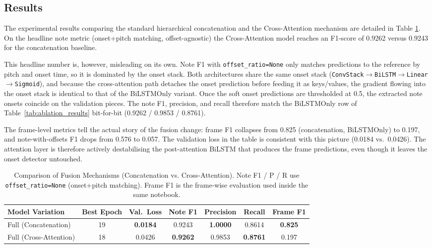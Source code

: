 \documentclass{article}
\begin{document}
\subsection{Results}
The experimental results comparing the standard hierarchical concatenation and the Cross-Attention mechanism are detailed in Table \ref{tab:improvement_results}. On the headline note metric (onset+pitch matching, offset-agnostic) the Cross-Attention model reaches an F1-score of 0.9262 versus 0.9243 for the concatenation baseline.

This headline number is, however, misleading on its own. Note F1 with \texttt{offset\_ratio=None} only matches predictions to the reference by pitch and onset time, so it is dominated by the onset stack. Both architectures share the same onset stack ({\small\texttt{ConvStack$\to$BiLSTM$\to$Linear$\to$Sigmoid}}), and because the cross-attention path detaches the onset prediction before feeding it as keys/values, the gradient flowing into the onset stack is identical to that of the BiLSTMOnly variant. Once the soft onset predictions are thresholded at 0.5, the extracted note onsets coincide on the validation pieces. The note F1, precision, and recall therefore match the BiLSTMOnly row of Table~\ref{tab:ablation_results} bit-for-bit (0.9262 / 0.9853 / 0.8761).

The frame-level metrics tell the actual story of the fusion change: frame F1 collapses from 0.825 (concatenation, BiLSTMOnly) to 0.197, and note-with-offsets F1 drops from 0.576 to 0.057. The validation loss in the table is consistent with this picture (0.0184 vs.\ 0.0426). The attention layer is therefore actively destabilising the post-attention BiLSTM that produces the frame predictions, even though it leaves the onset detector untouched.

\begin{table}[ht]
  \caption{Comparison of Fusion Mechanisms (Concatenation vs. Cross-Attention). Note F1 / P / R use \texttt{offset\_ratio=None} (onset+pitch matching). Frame F1 is the frame-wise evaluation used inside the same notebook.}
  \label{tab:improvement_results}
  \centering
  \begin{tabular}{lcccccc}
    \toprule
    Model Variation & Best Epoch & Val.\ Loss & Note F1 & Precision & Recall & Frame F1 \\
    \midrule
    Full (Concatenation)   & 19 & \textbf{0.0184} & 0.9243 & \textbf{1.0000} & 0.8614 & \textbf{0.825} \\
    Full (Cross-Attention) & 18 & 0.0426 & \textbf{0.9262} & 0.9853 & \textbf{0.8761} & 0.197 \\
    \bottomrule
  \end{tabular}
\end{table}
\end{document}
